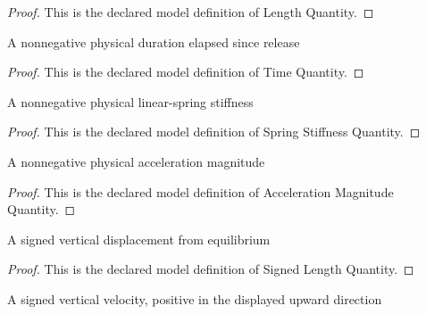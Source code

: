 \begin{proof}
  This is the declared model definition of Length Quantity.
\end{proof}
\begin{definition}
  \label{def:physics:phyx-mini-0718:phyxminiproblems-problemphyxmini0718-timequantity}
  A nonnegative physical duration elapsed since release
\end{definition}
\begin{proof}
  This is the declared model definition of Time Quantity.
\end{proof}
\begin{definition}
  \label{def:physics:phyx-mini-0718:phyxminiproblems-problemphyxmini0718-springstiffnessquantity}
  A nonnegative physical linear-spring stiffness
\end{definition}
\begin{proof}
  This is the declared model definition of Spring Stiffness Quantity.
\end{proof}
\begin{definition}
  \label{def:physics:phyx-mini-0718:phyxminiproblems-problemphyxmini0718-accelerationmagnitudequantity}
  A nonnegative physical acceleration magnitude
\end{definition}
\begin{proof}
  This is the declared model definition of Acceleration Magnitude Quantity.
\end{proof}
\begin{definition}
  \label{def:physics:phyx-mini-0718:phyxminiproblems-problemphyxmini0718-signedlengthquantity}
  A signed vertical displacement from equilibrium
\end{definition}
\begin{proof}
  This is the declared model definition of Signed Length Quantity.
\end{proof}
\begin{definition}
  \label{def:physics:phyx-mini-0718:phyxminiproblems-problemphyxmini0718-signedvelocityquantity}
  A signed vertical velocity, positive in the displayed upward direction
\end{definition}
